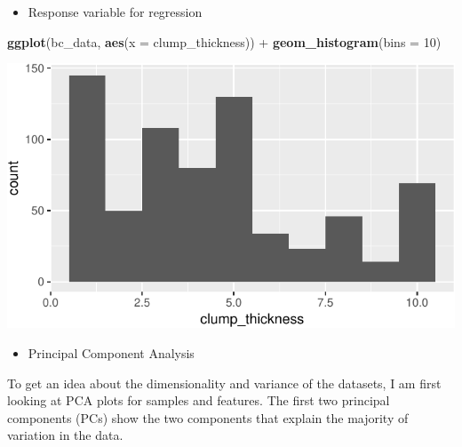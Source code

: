 \documentclass[]{article}
\newenvironment{Shaded}{\begin{snugshade}}{\end{snugshade}}
\newcommand{\KeywordTok}[1]{\textcolor[rgb]{0.13,0.29,0.53}{\textbf{{#1}}}}
\newcommand{\DataTypeTok}[1]{\textcolor[rgb]{0.13,0.29,0.53}{{#1}}}
\newcommand{\DecValTok}[1]{\textcolor[rgb]{0.00,0.00,0.81}{{#1}}}
\newcommand{\StringTok}[1]{\textcolor[rgb]{0.31,0.60,0.02}{{#1}}}
\newcommand{\NormalTok}[1]{{#1}}
\providecommand{\tightlist}{%
  \setlength{\itemsep}{0pt}\setlength{\parskip}{0pt}}
\begin{document}
\begin{itemize}
\tightlist
\item
  Response variable for regression
\end{itemize}

\begin{Shaded}
\begin{Highlighting}[]
\KeywordTok{ggplot}\NormalTok{(bc_data, }\KeywordTok{aes}\NormalTok{(}\DataTypeTok{x =} \NormalTok{clump_thickness)) +}
\StringTok{  }\KeywordTok{geom_histogram}\NormalTok{(}\DataTypeTok{bins =} \DecValTok{10}\NormalTok{)}
\end{Highlighting}
\end{Shaded}

\includegraphics{webinar_code_files/figure-latex/response_regression-1.pdf}

\begin{itemize}
\tightlist
\item
  Principal Component Analysis
\end{itemize}

To get an idea about the dimensionality and variance of the datasets, I
am first looking at PCA plots for samples and features. The first two
principal components (PCs) show the two components that explain the
majority of variation in the data.
\end{document}
